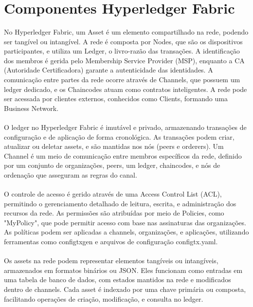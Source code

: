 \documentclass[letterpaper,11pt,leqno]{article}
\begin{document}
\section{Componentes Hyperledger Fabric}

\paragraph{}
No Hyperledger Fabric, um Asset é um elemento compartilhado na rede, podendo ser
tangível ou intangível. A rede é composta por Nodes, que são os dispositivos
participantes, e utiliza um Ledger, o livro-razão das transações. A
identificação dos membros é gerida pelo Membership Service Provider (MSP),
enquanto a CA (Autoridade Certificadora) garante a autenticidade das
identidades. A comunicação entre partes da rede ocorre através de Channels, que
possuem um ledger dedicado, e os Chaincodes atuam como contratos inteligentes. A
rede pode ser acessada por clientes externos, conhecidos como Clients, formando
uma Business Network.

\paragraph{}
O ledger no Hyperledger Fabric é imutável e privado, armazenando transações de
configuração e de aplicação de forma cronológica. As transações podem criar,
atualizar ou deletar assets, e são mantidas nos nós (peers e orderers). Um
Channel é um meio de comunicação entre membros específicos da rede, definido por
um conjunto de organizações, peers, um ledger, chaincodes, e nós de ordenação
que asseguram as regras do canal.

\paragraph{}
O controle de acesso é gerido através de uma Access Control List (ACL), permitindo o gerenciamento detalhado de leitura, escrita, e administração dos recursos da rede. As permissões são atribuídas por meio de Policies, como "MyPolicy", que pode permitir acesso com base nas assinaturas das organizações. As políticas podem ser aplicadas a channels, organizações, e aplicações, utilizando ferramentas como configtxgen e arquivos de configuração configtx.yaml.

\paragraph{}
Os assets na rede podem representar elementos tangíveis ou intangíveis,
armazenados em formatos binários ou JSON. Eles funcionam como entradas em uma
tabela de banco de dados, com estados mantidos na rede e modificados dentro de
channels. Cada asset é indexado por uma chave primária ou composta, facilitando
operações de criação, modificação, e consulta no ledger.
\end{document}
